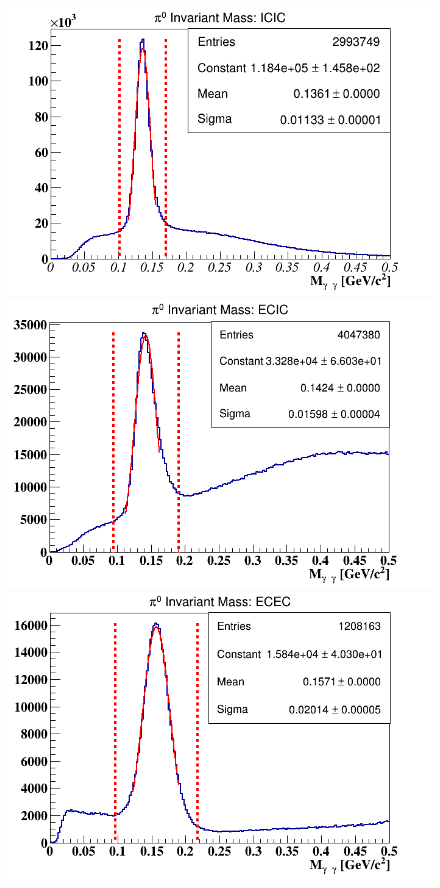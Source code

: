 \begin{figure}[tbp]
\hspace{-0.2in}
\includegraphics[scale=0.34]{fig_analysis/m_pi0_icic.png}
\hspace{-0.2in}
\includegraphics[scale=0.34]{fig_analysis/m_pi0_ecic.png}
\hspace*{-0.1in}
\includegraphics[scale=0.34]{fig_analysis/m_pi0_ecec.png}

\end{figure}
